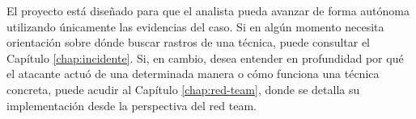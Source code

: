 El proyecto está diseñado para que el analista pueda avanzar de forma autónoma utilizando únicamente las evidencias del caso. Si en algún momento necesita orientación sobre dónde buscar rastros de una técnica, puede consultar el Capítulo \ref{chap:incidente}. Si, en cambio, desea entender en profundidad por qué el atacante actuó de una determinada manera o cómo funciona una técnica concreta, puede acudir al Capítulo \ref{chap:red-team}, donde se detalla su implementación desde la perspectiva del red team.

\begin{center}
\end{center}